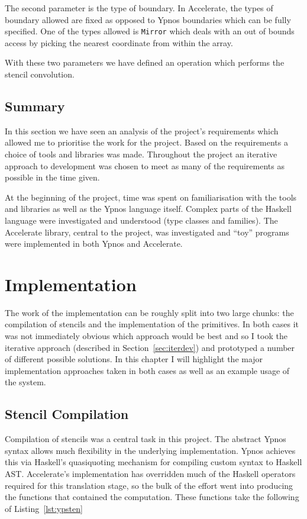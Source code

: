 \documentclass[12pt,a4paper,oneside]{scrbook}
\begin{document}
The second parameter is the type of boundary. In Accelerate, the types of
boundary allowed are fixed as opposed to Ypnos boundaries which can be fully
specified. One of the types allowed is \texttt{Mirror} which deals with an out
of bounds access by picking the nearest coordinate from within the array.

With these two parameters we have defined an operation which performs the
stencil convolution.


\section{Summary}

In this section we have seen an analysis of the project's requirements which
allowed me to prioritise the work for the project. Based on the requirements a
choice of tools and libraries was made. Throughout the project an iterative
approach to development was chosen to meet as many of the requirements as
possible in the time given.

At the beginning of the project, time was spent on familiarisation with the
tools and libraries as well as the Ypnos language itself. Complex parts of the
Haskell language were investigated and understood (type classes and
families). The Accelerate library, central to the project, was investigated and
``toy'' programs were implemented in both Ypnos and Accelerate.

\chapter{Implementation}
\label{sec:impl}

The work of the implementation can be roughly split into two large chunks: the
compilation of stencils and the implementation of the primitives. In both cases
it was not immediately obvious which approach would be best and so I took the
iterative approach (described in Section~\ref{sec:iterdev}) and prototyped a
number of different possible solutions. In this chapter I will highlight the
major implementation approaches taken in both cases as well as an example usage
of the system.

\section{Stencil Compilation}

Compilation of stencils was a central task in this project. The abstract Ypnos
syntax allows much flexibility in the underlying implementation.  Ypnos achieves
this via Haskell's quasiquoting mechanism\cite{} for compiling custom syntax to
Haskell AST. Accelerate's implementation has overridden much of the Haskell
operators required for this translation stage, so the bulk of the effort went
into producing the functions that contained the computation. These functions
take the following of Listing~\ref{lst:ypsten}
\end{document}

